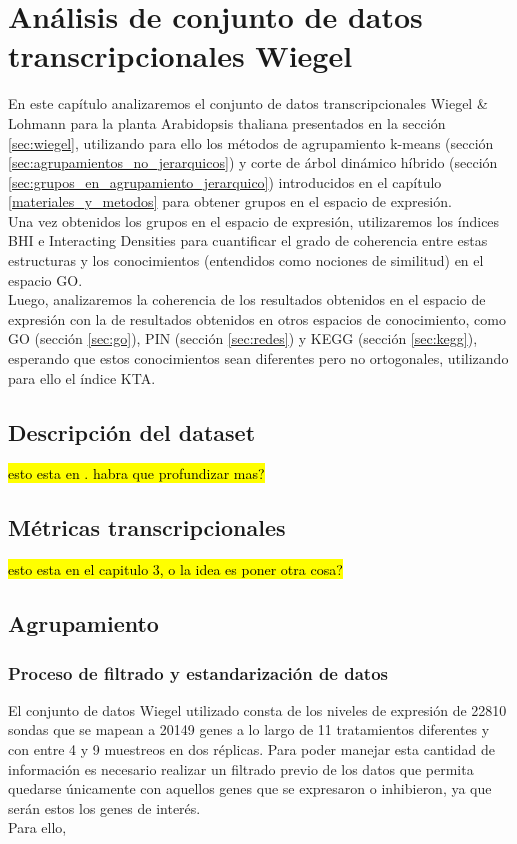 \chapter{Análisis de conjunto de datos transcripcionales Wiegel}
En este capítulo analizaremos el conjunto de datos transcripcionales Wiegel \& Lohmann para la planta Arabidopsis thaliana presentados en la sección \ref{sec:wiegel}, utilizando para ello los métodos de agrupamiento k-means (sección \ref{sec:agrupamientos_no_jerarquicos}) y corte de árbol dinámico híbrido (sección \ref{sec:grupos_en_agrupamiento_jerarquico}) introducidos en el capítulo \ref{materiales_y_metodos} para obtener grupos en el espacio de expresión.\\
Una vez obtenidos los grupos en el espacio de expresión, utilizaremos los índices BHI e Interacting Densities para cuantificar el grado de coherencia entre estas estructuras y los conocimientos (entendidos como nociones de similitud) en el espacio GO.\\
Luego, analizaremos la coherencia de los resultados obtenidos en el espacio de expresión con la de resultados obtenidos en otros espacios de conocimiento, como GO (sección \ref{sec:go}), PIN  (sección \ref{sec:redes}) y KEGG (sección \ref{sec:kegg}), esperando que estos conocimientos sean diferentes pero no ortogonales, utilizando para ello el índice KTA. 
\section{Descripción del dataset}
\hl{esto esta en \label{sec:wiegel}. habra que profundizar mas?}
\section{Métricas transcripcionales}
\hl{esto esta en el capitulo 3, o la idea es poner otra cosa?}
\section{Agrupamiento}

\subsection{Proceso de filtrado y estandarización de datos}
El conjunto de datos Wiegel utilizado consta de los niveles de expresión de 22810 sondas que se mapean a 20149 genes a lo largo de 11 tratamientos diferentes y con entre 4 y 9 muestreos en dos réplicas. Para poder manejar esta cantidad de información es necesario realizar un filtrado previo de los datos que permita quedarse únicamente con aquellos genes que se expresaron o inhibieron, ya que serán estos los genes de interés.\\
Para ello,  
